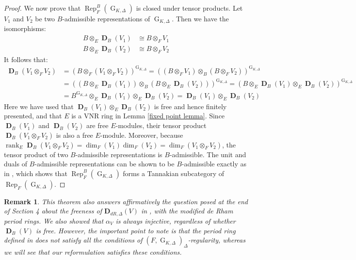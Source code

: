 \documentclass{amsart}
\newtheorem{remark}[proposition]{Remark}
\DeclareMathOperator{\rank}{rank}
\newcommand{\mbDdR}{\textbf{D}_{dR,\Delta}}
\DeclareMathOperator{\G}{G}
\DeclareMathOperator{\Rep}{Rep}
\DeclareMathOperator{\bD}{\textbf{D}}
\begin{document}
\begin{proof}
       We now prove that $\Rep^B_F(\G_{K,\Delta})$ is closed under tensor products. Let $V_1$ and $V_2$ be two $B$-admissible representations of $\G_{K,\Delta}$. Then we have the isomorphisms:
    \begin{align*}
        B\otimes_E\bD_B(V_1) &\cong B\otimes_F V_1 \\
        B\otimes_E\bD_B(V_2) &\cong B\otimes_F V_2
    \end{align*}
    It follows that:
    \begin{align*}
        \bD_B(V_1\otimes_F V_2) &= (B\otimes_F (V_1\otimes_F V_2))^{\G_{K,\Delta}} 
                               = ((B\otimes_F V_1)\otimes_B (B\otimes_F V_2))^{\G_{K,\Delta}} \\
                               &= ((B\otimes_E\bD_B(V_1))\otimes_B (B\otimes_E\bD_B(V_2)))^{\G_{K,\Delta}}
                               = (B\otimes_E\bD_B(V_1)\otimes_E\bD_B(V_2))^{\G_{K,\Delta}}\\
                               &=B^{\G_{K,\Delta}}\otimes_E\bD_B(V_1)\otimes_E\bD_B(V_2)
                               =\bD_B(V_1)\otimes_E\bD_B(V_2)
    \end{align*}
    Here we have used that $\bD_B(V_1)\otimes_E\bD_B(V_2)$ is free and hence finitely presented, and that $E$ is a VNR ring in Lemma \ref{fixed point lemma}. Since $\bD_B(V_1)$ and $\bD_B(V_2)$ are free $E$-modules, their tensor product $\bD_B(V_1\otimes_F V_2)$ is also a free $E$-module. Moreover, because $\rank_E\bD_B(V_1\otimes_F V_2) = \dim_F(V_1)\dim_F(V_2) = \dim_F(V_1\otimes_F V_2)$, the tensor product of two $B$-admissible representations is $B$-admissible. The unit and duals of $B$-admissible representations can be shown to be $B$-admissible exactly as in \cite{Fontaine}, which shows that $\Rep^B_F(\G_{K,\Delta})$ forms a Tannakian subcategory of $\Rep_F(\G_{K,\Delta})$.
\end{proof}

\begin{remark}
    This theorem also answers affirmatively the question posed at the end of Section 4 about the freeness of $\mbDdR(V)$ in \cite{BCM}, with the modified de Rham period rings. We also showed that $\alpha_V$ is always injective, regardless of whether $\bD_B(V)$ is free. However, the important point to note is that the period ring defined in \cite{BCM} does not satisfy all the conditions of $(F,\G_{K,\Delta})_{\Delta}$-regularity, whereas we will see that our reformulation satisfies these conditions.
\end{remark}
\end{document}

